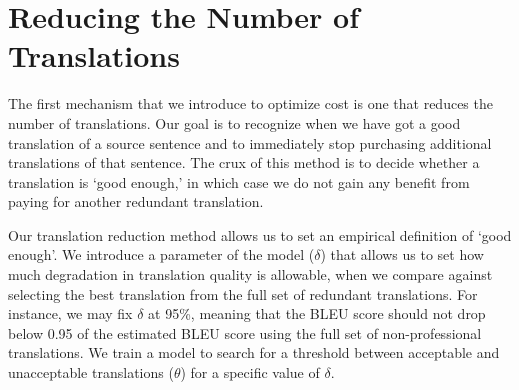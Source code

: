 \documentclass[11pt,letterpaper]{article}
\begin{document}
\section{Reducing the Number of Translations}
The first mechanism that we introduce to optimize cost is one that reduces the number of translations.  Our goal is to recognize when we have got a good translation of a source sentence and to immediately stop purchasing additional  translations of that sentence.  The crux of this method is to decide whether a translation  is `good enough,' in which case we do not gain any benefit from  paying for another redundant translation.  

Our translation reduction method allows us to set an empirical definition of `good enough'.  We introduce a parameter  of the model  ($\delta$) that allows us to set how much degradation in translation quality is allowable, when we compare against selecting the best translation from the full set of redundant translations.  For instance, we may fix $\delta$ at 95\%, meaning that the BLEU score should not drop below 0.95 of the estimated BLEU score using the full set of non-professional translations.   We train a model to search for a threshold between acceptable and unacceptable translations ($\theta$) for a specific value of $\delta$. 
\end{document}
